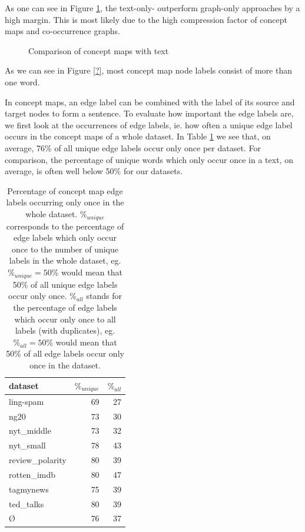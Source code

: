 As one can see in Figure \ref{fig:results_cmap_vs_text}, the text-only- outperform graph-only approaches by a high margin.
This is most likely due to the high compression factor of concept maps and co-occurrence graphs.

\begin{figure}[htb!]
\centering
\missingfigure[figcolor=white]{}
\caption[Results: Concept Maps vs. Text]{Comparison of concept maps with text}
\label{fig:results_cmap_vs_text}
\end{figure}

As we can see in Figure \ref{?}, most concept map node labels consist of more than one word. 


In concept maps, an edge label can be combined with the label of its source and target nodes to form a sentence.
To evaluate how important the edge labels are, we first look at the occurrences of edge labels, ie. how often a unique edge label occurs in the concept maps of a whole dataset.
In Table \ref{table:edge_label_occurrences} we see that, on average, 76\% of all unique edge labels occur only once per dataset. For comparison, the percentage of unique words which only occur once in a text, on average, is often well below 50\% for our datasets.

\begin{table}[htb!]
	\centering
	\begin{tabular}{lrr}
		dataset &  $ \%_{unique} $ & $ \%_{all}$  \\
		\midrule
		ling-spam       & 69 & 27 \\
		ng20            & 73 & 30 \\
		nyt\_middle      & 73 & 32 \\
		nyt\_small       & 78 & 43 \\
		review\_polarity & 80 & 39 \\
		rotten\_imdb     & 80 & 47 \\
		tagmynews       & 75 & 39 \\
		ted\_talks       & 80 & 39 \\
		\midrule
		\O           & 76 & 37 \\
		\bottomrule
	\end{tabular}
	\caption[Statistics: Percentage of concept map labels occurring once]{Percentage of concept map edge labels occurring only once in the whole dataset.
		$ \%_{unique} $ corresponds to the percentage of edge labels which only occur once to the number of unique labels in the whole dataset, eg. $ \%_{unique} = 50\% $ would mean that 50\% of all unique edge labels occur only once.
		$ \%_{all}$ stands for the percentage of edge labels which occur only once to all labels (with duplicates), eg. $ \%_{all} = 50\%$ would mean that 50\% of all edge labels occur only once in the dataset.}\label{table:edge_label_occurrences}
\end{table}

